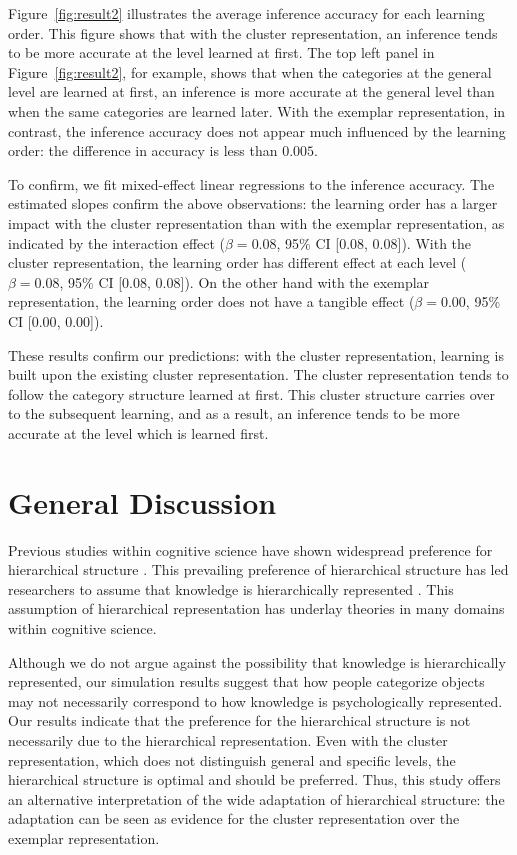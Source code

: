 \documentclass[doc]{apa6}
\begin{document}
Figure~\ref{fig:result2} illustrates the average inference accuracy for each learning order. This
figure shows that with the cluster representation, an inference tends to be more accurate at the
level learned at first.  The top left panel in Figure~\ref{fig:result2}, for example, shows that
when the categories at the general level are learned at first, an inference is more accurate at the
general level than when the same categories are learned later. With the exemplar representation, in
contrast, the inference accuracy does not appear much influenced by the learning order: the
difference in accuracy is less than $0.005$.

To confirm, we fit mixed-effect linear regressions to the inference accuracy. The estimated slopes
confirm the above observations: the learning order has a larger impact with the cluster
representation than with the exemplar representation, as indicated by the interaction effect
($\beta=0.08$, 95\% CI [$0.08$, $0.08$]). With the cluster representation, the learning order has
different effect at each level ($\beta=0.08$, 95\% CI [$0.08$, $0.08$]). On the other hand with the
exemplar representation, the learning order does not have a tangible effect ($\beta=0.00$, 95\%
CI [$0.00$, $0.00$]).

These results confirm our predictions: with the cluster representation, learning is built upon the
existing cluster representation. The cluster representation tends to follow the category structure
learned at first.  This cluster structure carries over to the subsequent learning, and as a result,
an inference tends to be more accurate at the level which is learned first.


\section*{General Discussion}

Previous studies within cognitive science have shown widespread preference for hierarchical
structure \parencite[e.g.,][]{Rosch1976a}. This prevailing preference of hierarchical structure has
led researchers to assume that knowledge is hierarchically represented
\parencite[e.g.,][]{Markman1984a, Markman1989a}.  This assumption of hierarchical representation has
underlay theories in many domains within cognitive science.

Although we do not argue against the possibility that knowledge is hierarchically represented, our
simulation results suggest that how people categorize objects may not necessarily correspond to how
knowledge is psychologically represented. Our results indicate that the preference for the
hierarchical structure is not necessarily due to the hierarchical representation. Even with the
cluster representation, which does not distinguish general and specific levels, the hierarchical
structure is optimal and should be preferred. Thus, this study offers an alternative interpretation
of the wide adaptation of hierarchical structure: the adaptation can be seen as evidence for the
cluster representation over the exemplar representation.
\end{document}
